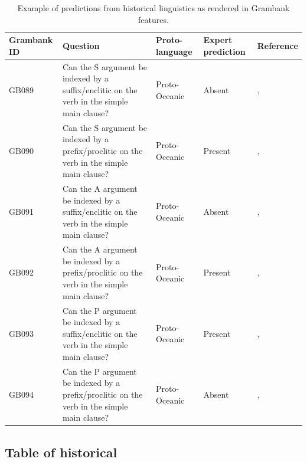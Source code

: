 \documentclass[a4paper,10pt]{article} %
\begin{document}
\begin{table}[H] %
\centering
\caption{Example of predictions from historical linguistics as rendered in Grambank features.}
\label{example_HL_prediction_table}
\begin{tabular}{|l| p{3cm}|  p{3cm}| p{3cm} | p{3cm} |}
\hline
\textbf{Grambank ID} & \textbf{Question} & \textbf{Proto-language} & \textbf{Expert prediction}& \textbf{Reference} \\ \hline
GB089  &Can the S argument be indexed by a suffix/enclitic on the verb in the simple main clause? &Proto-Oceanic &Absent & \citet[498-499]{ross2004morphosyntactic}, \citet[83]{lynchrosscrowley_proto_grammar_oceanic} \\ \hline
GB090 &Can the S argument be indexed by a prefix/proclitic on the verb in the simple main clause? &Proto-Oceanic &Present &\citet[498-499]{ross2004morphosyntactic}, \citet[83]{lynchrosscrowley_proto_grammar_oceanic}  \\ \hline
GB091 &Can the A argument be indexed by a suffix/enclitic on the verb in the simple main clause? &Proto-Oceanic &Absent &\citet[498-499]{ross2004morphosyntactic}, \citet[83]{lynchrosscrowley_proto_grammar_oceanic} \\ \hline
GB092  &Can the A argument be indexed by a prefix/proclitic on the verb in the simple main clause? &Proto-Oceanic &Present &\citet[498-499]{ross2004morphosyntactic}, \citet[83]{lynchrosscrowley_proto_grammar_oceanic}  \\ \hline
GB093  &Can the P argument be indexed by a suffix/enclitic on the verb in the simple main clause? &Proto-Oceanic &Present &\citet[498-499]{ross2004morphosyntactic}, \citet[83]{lynchrosscrowley_proto_grammar_oceanic} \\ \hline
GB094  &Can the P argument be indexed by a prefix/proclitic on the verb in the simple main clause? &Proto-Oceanic &Absent & \citet[498-499]{ross2004morphosyntactic}, \citet[83]{lynchrosscrowley_proto_grammar_oceanic} \\ \hline
\end{tabular}
\end{table}

\subsection{Table of historical}
\label{supp:proto_lg_coding_table}
\end{document}
